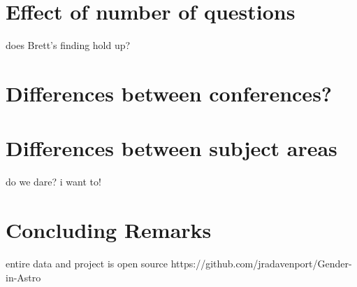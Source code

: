 \documentclass[iop]{emulateapj}
\begin{document}
\section{Effect of number of questions}
does Brett's finding hold up?


\section{Differences between conferences?}


\section{Differences between subject areas} 
do we dare? i want to!


\section{Concluding Remarks}

entire data and project is open source
https://github.com/jradavenport/Gender-in-Astro


\acknowledgements
\end{document}
